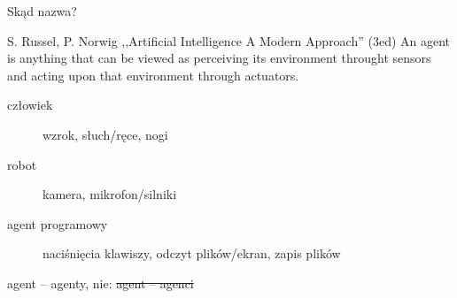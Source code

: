 \documentclass{sa}
\begin{document}
\begin{frame}{Skąd nazwa?}
	\begin{block}{S. Russel, P. Norwig ,,Artificial Intelligence A Modern Approach'' (3ed)}
		An agent is anything that can be viewed as perceiving its environment throught sensors and acting upon that environment through actuators.
	\end{block}
\pause
	\begin{description}
		\item[człowiek] wzrok, słuch/ręce, nogi
		\item[robot] kamera, mikrofon/silniki
		\item[agent programowy] naciśnięcia klawiszy, odczyt plików/ekran, zapis plików
	\end{description}
\pause
	agent -- agenty, nie: \st{agent -- agenci}
\end{frame}
\end{document}
